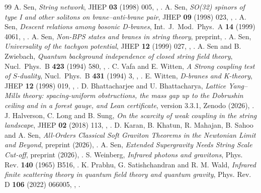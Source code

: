 \begin{thebibliography}{99}
 A. Sen, \emph{String network}, JHEP \textbf{03} (1998) 005, , .
 A. Sen, \emph{SO(32) spinors of type I and other solitons on brane--anti-brane pair}, JHEP \textbf{09} (1998) 023, , .
 A. Sen, \emph{Descent relations among bosonic D-branes}, Int.\ J.\ Mod.\ Phys.\ A \textbf{14} (1999) 4061, , .
 A. Sen, \emph{Non-BPS states and branes in string theory}, preprint, .
 A. Sen, \emph{Universality of the tachyon potential}, JHEP \textbf{12} (1999) 027, , .
 A. Sen and B. Zwiebach, \emph{Quantum background independence of closed string field theory}, Nucl.\ Phys.\ B \textbf{423} (1994) 580, , .
 C. Vafa and E. Witten, \emph{A Strong coupling test of $S$-duality}, Nucl.\ Phys.\ B \textbf{431} (1994) 3, , .
 E. Witten, \emph{D-branes and K-theory}, JHEP \textbf{12} (1998) 019, , .
 D. Bhattacharjee and U. Bhattacharya, \emph{Lattice Yang--Mills theory: spacing-uniform obstructions, the mass gap up to the Dobrushin ceiling and in a forest gauge, and Lean certificate}, version 3.3.1, Zenodo (2026), .
 J. Halverson, C. Long and B. Sung, \emph{On the scarcity of weak coupling in the string landscape}, JHEP \textbf{02} (2018) 113, , .
 D. Karan, B. Khatun, R. Mahajan, B. Sahoo and A. Sen, \emph{All-Orders Classical Soft Graviton Theorems in the Newtonian Limit and Beyond}, preprint (2026), .
 A. Sen, \emph{Extended Supergravity Needs String Scale Cut-off}, preprint (2026), .
 S. Weinberg, \emph{Infrared photons and gravitons}, Phys. Rev. \textbf{140} (1965) B516, .
 K. Prabhu, G. Satishchandran and R. M. Wald, \emph{Infrared finite scattering theory in quantum field theory and quantum gravity}, Phys. Rev. D \textbf{106} (2022) 066005, , .

\end{thebibliography}

